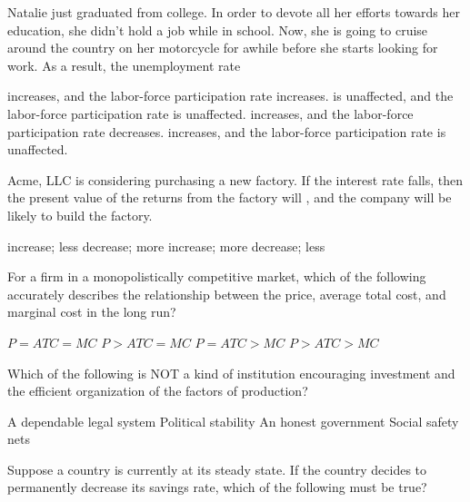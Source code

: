 \documentclass[addpoints,11pt]{exam}
\theoremstyle{definition}
\newcommand{\blank}[0]{\underline{\hspace{3cm}}}
\begin{document}
\begin{questions}
	
\question Natalie just graduated from college. In order to devote all her efforts towards her education, she didn't hold a job while in school. Now, she is going to cruise around the country on her motorcycle for awhile before she starts looking for work. As a result, the unemployment rate

\begin{choices}
		\choice increases, and the labor-force participation rate increases.
		\CorrectChoice is unaffected, and the labor-force participation rate is unaffected.
		\choice increases, and the labor-force participation rate decreases. 
		\choice increases, and the labor-force participation rate is unaffected.
\end{choices}

	
\question Acme, LLC is considering purchasing a new factory. If the interest rate falls, then the present value of the returns from the factory will \blank, and the company will be \blank likely to build the factory.

		\begin{choices}
			\choice increase; less
			\choice decrease; more
			\CorrectChoice increase; more
			\choice decrease; less
		\end{choices}
		
\newpage

	\question For a firm in a monopolistically competitive market, which of the following accurately describes the relationship between the price, average total cost, and marginal cost in the long run?
	
	\begin{choices}
			\choice $P = ATC = MC$
			\choice $P > ATC = MC$
			\CorrectChoice $P = ATC > MC$
			\choice $P > ATC > MC$
	\end{choices}

	
	\question Which of the following is NOT a kind of institution encouraging investment and the efficient organization of the factors of production?
	
	
	\begin{choices}
			\choice A dependable legal system
			\choice Political stability
			\choice An honest government
			\CorrectChoice Social safety nets
	\end{choices}
	


\question Suppose a country is currently at its steady state. If the country decides to permanently decrease its savings rate, which of the following must be true?


\end{questions}
\end{document}
